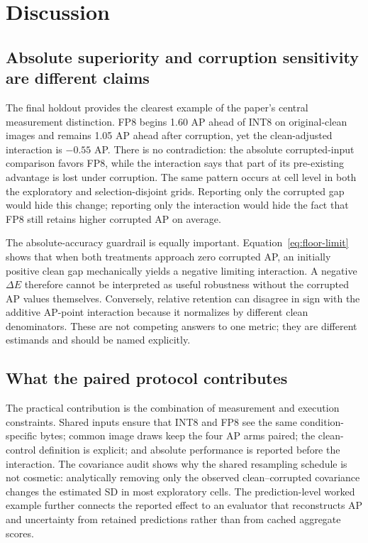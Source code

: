 \documentclass[a4paper,fleqn]{cas-dc}
\begin{document}
\section{Discussion}
\label{sec:discussion}

\subsection{Absolute superiority and corruption sensitivity are different claims}

The final holdout provides the clearest example of the paper's central measurement distinction. FP8 begins 1.60 AP ahead of INT8 on original-clean images and remains 1.05 AP ahead after corruption, yet the clean-adjusted interaction is $-0.55$ AP. There is no contradiction: the absolute corrupted-input comparison favors FP8, while the interaction says that part of its pre-existing advantage is lost under corruption. The same pattern occurs at cell level in both the exploratory and selection-disjoint grids. Reporting only the corrupted gap would hide this change; reporting only the interaction would hide the fact that FP8 still retains higher corrupted AP on average.

The absolute-accuracy guardrail is equally important. Equation~\eqref{eq:floor-limit} shows that when both treatments approach zero corrupted AP, an initially positive clean gap mechanically yields a negative limiting interaction. A negative $\Delta E$ therefore cannot be interpreted as useful robustness without the corrupted AP values themselves. Conversely, relative retention can disagree in sign with the additive AP-point interaction because it normalizes by different clean denominators. These are not competing answers to one metric; they are different estimands and should be named explicitly.

\subsection{What the paired protocol contributes}

The practical contribution is the combination of measurement and execution constraints. Shared inputs ensure that INT8 and FP8 see the same condition-specific bytes; common image draws keep the four AP arms paired; the clean-control definition is explicit; and absolute performance is reported before the interaction. The covariance audit shows why the shared resampling schedule is not cosmetic: analytically removing only the observed clean--corrupted covariance changes the estimated SD in most exploratory cells. The prediction-level worked example further connects the reported effect to an evaluator that reconstructs AP and uncertainty from retained predictions rather than from cached aggregate scores.
\end{document}
